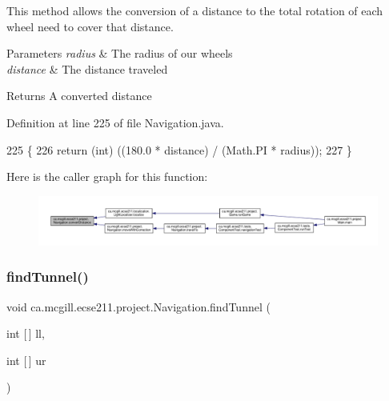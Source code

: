 This method allows the conversion of a distance to the total rotation of each wheel need to cover that distance.


\begin{DoxyParams}{Parameters}
{\em radius} & The radius of our wheels \\
\hline
{\em distance} & The distance traveled \\
\hline
\end{DoxyParams}
\begin{DoxyReturn}{Returns}
A converted distance 
\end{DoxyReturn}


Definition at line 225 of file Navigation.\+java.


\begin{DoxyCode}
225                                                                     \{
226     \textcolor{keywordflow}{return} (\textcolor{keywordtype}{int}) ((180.0 * distance) / (Math.PI * radius));
227   \}
\end{DoxyCode}
Here is the caller graph for this function\+:\nopagebreak
\begin{figure}[H]
\begin{center}
\leavevmode
\includegraphics[width=350pt]{classca_1_1mcgill_1_1ecse211_1_1project_1_1_navigation_ac9e260bcd619ffa4820d7d0de7ea1c12_icgraph}
\end{center}
\end{figure}
\mbox{\label{classca_1_1mcgill_1_1ecse211_1_1project_1_1_navigation_ae0588f4dbf493a982171b8e7814bff37}} 
\subsubsection{\texorpdfstring{find\+Tunnel()}{findTunnel()}}
{\footnotesize\ttfamily void ca.\+mcgill.\+ecse211.\+project.\+Navigation.\+find\+Tunnel (\begin{DoxyParamCaption}\item[{int \mbox{[}$\,$\mbox{]}}]{ll,  }\item[{int \mbox{[}$\,$\mbox{]}}]{ur }\end{DoxyParamCaption})}

